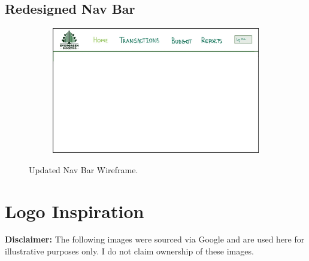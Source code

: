 \documentclass{l4proj}
\begin{document}
\begin{appendices}
\section{Redesigned Nav Bar}
\label{app:wireframes-nav-bar}
\begin{figure}[htb] 
    \centering
    \begin{subfigure}[b]{0.8\textwidth}
        \includegraphics[width=\textwidth]{images/Wireframes/wireframe-nav-desktop.png}
    \end{subfigure}   
    \caption{Updated Nav Bar Wireframe.}\label{fig:nav-bar}
\end{figure}

\chapter{Logo Inspiration}
\label{app:logo-inspiration}
\textbf{Disclaimer:} The following images were sourced via Google and are used here for illustrative purposes only. I do not claim ownership of these images.


\end{appendices}
\end{document}
